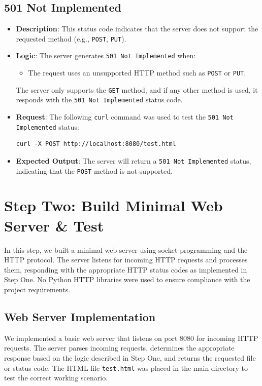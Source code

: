 \documentclass{article}
\begin{document}
\subsection*{501 Not Implemented}

\begin{itemize}
    \item \textbf{Description}: This status code indicates that the server does not support the requested method (e.g., \texttt{POST}, \texttt{PUT}).
    \item \textbf{Logic}: 
    The server generates \texttt{501 Not Implemented} when:
    \begin{itemize}
        \item The request uses an unsupported HTTP method such as \texttt{POST} or \texttt{PUT}.
    \end{itemize}
    The server only supports the \texttt{GET} method, and if any other method is used, it responds with the \texttt{501 Not Implemented} status code.
    \item \textbf{Request}: The following \texttt{curl} command was used to test the \texttt{501 Not Implemented} status:
\begin{lstlisting}
curl -X POST http://localhost:8080/test.html
\end{lstlisting}
    \item \textbf{Expected Output}: The server will return a \texttt{501 Not Implemented} status, indicating that the \texttt{POST} method is not supported.
\end{itemize}


\section*{Step Two: Build Minimal Web Server \& Test}

In this step, we built a minimal web server using socket programming and the HTTP protocol. The server listens for incoming HTTP requests and processes them, responding with the appropriate HTTP status codes as implemented in Step One. No Python HTTP libraries were used to ensure compliance with the project requirements.

\subsection*{Web Server Implementation}

We implemented a basic web server that listens on port 8080 for incoming HTTP requests. The server parses incoming requests, determines the appropriate response based on the logic described in Step One, and returns the requested file or status code. The HTML file \texttt{test.html} was placed in the main directory to test the correct working scenario.
\end{document}
